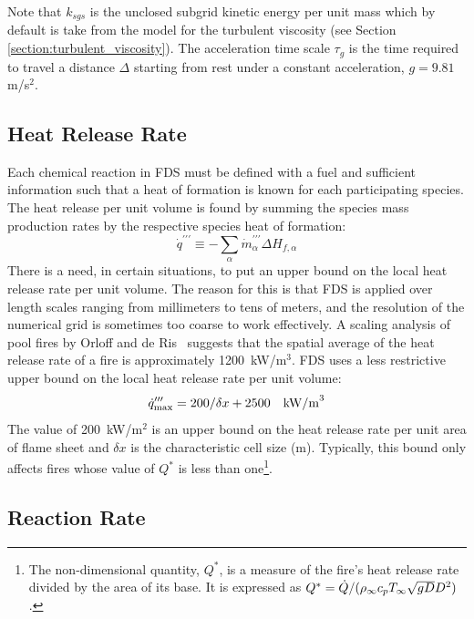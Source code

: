 Note that $k_{sgs}$ is the unclosed subgrid kinetic energy per unit mass which by default is take from the model for the turbulent viscosity (see Section \ref{section:turbulent_viscosity}). The acceleration time scale $\tau_{g}$ is the time required to travel a distance $\Delta$ starting from rest under a constant acceleration, $g=9.81$ m/s$^2$.

\subsection{Heat Release Rate}

Each chemical reaction in FDS must be defined with a fuel and sufficient information such that a heat of formation is known for each participating species. The heat release per unit volume is found by summing the species mass production rates by the respective species heat of formation:
\begin{equation}\label{eq:vol_heat_gen}
\dot{q}^{\prime\prime\prime} \equiv -\displaystyle \sum_{\alpha} \dot{m}^{\prime\prime\prime}_{\alpha} \Delta H_{f,\alpha}
\end{equation}
There is a need, in certain situations, to put an upper bound on the local heat release rate per unit volume. The reason for
this is that FDS is applied over length scales ranging from millimeters to tens of meters, and the resolution of the numerical grid
is sometimes too coarse to work effectively.
A scaling analysis of pool fires by Orloff and de Ris~\cite{Orloff:19th_Symposium} suggests that the spatial average of the
heat release rate of a fire is approximately 1200~kW/m$^3$. FDS uses a less restrictive upper bound on the local heat release rate per unit volume:
\begin{equation}\label{eq:q_bound} 
\dot{q}_{\max}''' = 200/\delta x + 2500 \quad \hbox{kW/m}^3 
\end{equation}
The value of 200~kW/m$^2$ is an upper bound on the heat release rate per unit area of flame sheet and $\delta x$ is the characteristic cell size (m). Typically, this bound only affects fires whose value of $Q^*$ is less than one\footnote{The non-dimensional quantity, $Q^*$, is a measure of the fire's heat release rate divided by the
area of its base. It is expressed as $Q^*=\dot{Q}/(\rho_\infty c_p T_\infty \sqrt{g D} D^2)$.}.

\subsection{Reaction Rate} 
\label{Reaction_Rate_Model}

